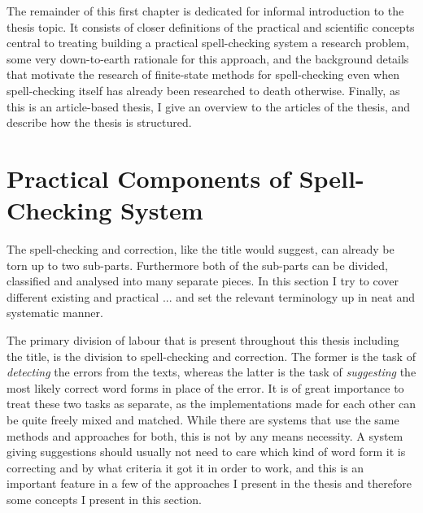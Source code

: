 \documentclass[officiallayout,draft]{unihelcompling}
\begin{document}
The remainder of this first chapter is dedicated for informal introduction to
the thesis topic. It consists of closer definitions of the practical and
scientific concepts central to treating building a practical spell-checking
system a research problem, some very down-to-earth rationale for this approach,
and the background details that motivate the research of finite-state methods
for spell-checking even when spell-checking itself has already been researched
to death otherwise. Finally, as this is an article-based thesis, I give an
overview to the articles of the thesis, and describe how the thesis is
structured.

\section{Practical Components of Spell-Checking System}
\label{sec:practical-components}

The spell-checking and correction, like the title would suggest, can already
be torn up to two sub-parts. Furthermore both of the sub-parts can be divided,
classified and analysed into many separate pieces. In this section I try to
cover different existing and practical ... and set the relevant terminology up
in neat and systematic manner.

The primary division of labour that is present throughout this thesis including
the title, is the division to spell-checking and correction. The former is the
task of \emph{detecting} the errors from the texts, whereas the latter is the
task of \emph{suggesting} the most likely correct word forms in place of the
error. It is of great importance to treat these two tasks as separate, as the
implementations made for each other can be quite freely mixed and matched.
While there are systems that use the same methods and approaches for both,
this is not by any means necessity. A system giving suggestions should usually
not need to care which kind of word form it is correcting and by what criteria
it got it in order to work, and this is an important feature in a few of the
approaches I present in the thesis and therefore some concepts I present in
this section.
\end{document}
